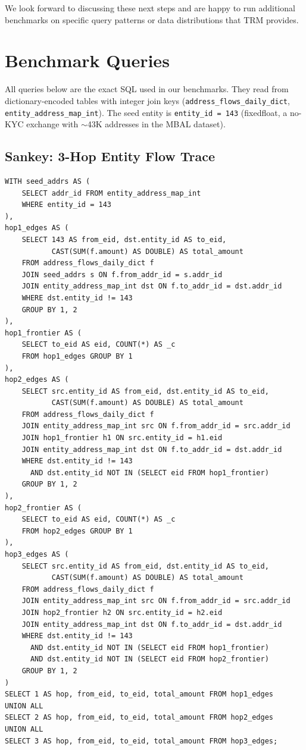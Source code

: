 \documentclass[11pt,a4paper]{article}
\begin{document}
\bigskip
\noindent We look forward to discussing these next steps and are happy to run
additional benchmarks on specific query patterns or data distributions that TRM
provides.

\appendix
\section{Benchmark Queries}
\label{sec:queries}

All queries below are the exact SQL used in our benchmarks. They read from
dictionary-encoded tables with integer join keys
(\texttt{address\_flows\_daily\_dict}, \texttt{entity\_address\_map\_int}). The
seed entity is \texttt{entity\_id = 143} (fixedfloat, a no-KYC exchange with
$\sim$43K addresses in the MBAL dataset).

\subsection*{Sankey: 3-Hop Entity Flow Trace}

\begin{lstlisting}
WITH seed_addrs AS (
    SELECT addr_id FROM entity_address_map_int
    WHERE entity_id = 143
),
hop1_edges AS (
    SELECT 143 AS from_eid, dst.entity_id AS to_eid,
           CAST(SUM(f.amount) AS DOUBLE) AS total_amount
    FROM address_flows_daily_dict f
    JOIN seed_addrs s ON f.from_addr_id = s.addr_id
    JOIN entity_address_map_int dst ON f.to_addr_id = dst.addr_id
    WHERE dst.entity_id != 143
    GROUP BY 1, 2
),
hop1_frontier AS (
    SELECT to_eid AS eid, COUNT(*) AS _c
    FROM hop1_edges GROUP BY 1
),
hop2_edges AS (
    SELECT src.entity_id AS from_eid, dst.entity_id AS to_eid,
           CAST(SUM(f.amount) AS DOUBLE) AS total_amount
    FROM address_flows_daily_dict f
    JOIN entity_address_map_int src ON f.from_addr_id = src.addr_id
    JOIN hop1_frontier h1 ON src.entity_id = h1.eid
    JOIN entity_address_map_int dst ON f.to_addr_id = dst.addr_id
    WHERE dst.entity_id != 143
      AND dst.entity_id NOT IN (SELECT eid FROM hop1_frontier)
    GROUP BY 1, 2
),
hop2_frontier AS (
    SELECT to_eid AS eid, COUNT(*) AS _c
    FROM hop2_edges GROUP BY 1
),
hop3_edges AS (
    SELECT src.entity_id AS from_eid, dst.entity_id AS to_eid,
           CAST(SUM(f.amount) AS DOUBLE) AS total_amount
    FROM address_flows_daily_dict f
    JOIN entity_address_map_int src ON f.from_addr_id = src.addr_id
    JOIN hop2_frontier h2 ON src.entity_id = h2.eid
    JOIN entity_address_map_int dst ON f.to_addr_id = dst.addr_id
    WHERE dst.entity_id != 143
      AND dst.entity_id NOT IN (SELECT eid FROM hop1_frontier)
      AND dst.entity_id NOT IN (SELECT eid FROM hop2_frontier)
    GROUP BY 1, 2
)
SELECT 1 AS hop, from_eid, to_eid, total_amount FROM hop1_edges
UNION ALL
SELECT 2 AS hop, from_eid, to_eid, total_amount FROM hop2_edges
UNION ALL
SELECT 3 AS hop, from_eid, to_eid, total_amount FROM hop3_edges;
\end{lstlisting}
\end{document}
